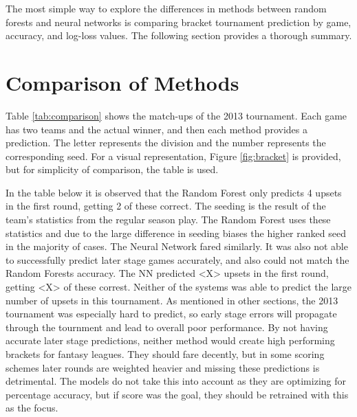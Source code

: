 \documentclass[conference]{IEEEtran}
\begin{document}
{The most simple way to explore the differences in methods between random forests and neural networks is comparing bracket tournament prediction by game, accuracy, and log-loss values.
The following section provides a thorough summary. 

\section{Comparison of Methods}
Table \ref{tab:comparison} shows the match-ups of the 2013 tournament. 
Each game has two teams and the actual winner, and then each method provides a prediction. 
The letter represents the division and the number represents the corresponding seed.
For a visual representation, Figure \ref{fig:bracket} is provided, but for simplicity of comparison, the table is used.

In the table below it is observed that the Random Forest only predicts 4 upsets in the first round, getting 2 of these correct. 
The seeding is the result of the team's statistics from the regular season play.
The Random Forest uses these statistics and due to the large difference in seeding biases the higher ranked seed in the majority of cases. 
The Neural Network fared similarly.
It was also not able to successfully predict later stage games accurately, and also could not match the Random Forests accuracy.
The NN predicted <X> upsets in the first round, getting <X> of these correst.
Neither of the systems was able to predict the large number of upsets in this tournament. 
As mentioned in other sections, the 2013 tournament was especially hard to predict, so early stage errors will propagate through the tournment and lead to overall poor performance. 
By not having accurate later stage predictions, neither method would create high performing brackets for fantasy leagues. They should fare decently, but in some scoring schemes later rounds are weighted heavier and missing these predictions is detrimental. The models do not take this into account as they are optimizing for percentage accuracy, but if score was the goal, they should be retrained with this as the focus.

}
\end{document}
